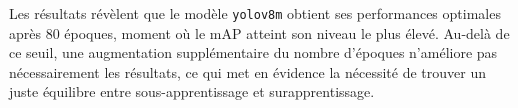 \begin{flushleft}
	Les résultats révèlent que le modèle \texttt{yolov8m} obtient ses performances optimales après 80 époques, moment où le mAP atteint son niveau le plus élevé. Au-delà de ce seuil, une augmentation supplémentaire du nombre d'époques n'améliore pas nécessairement les résultats, ce qui met en évidence la nécessité de trouver un juste équilibre entre sous-apprentissage et surapprentissage.
\end{flushleft}


